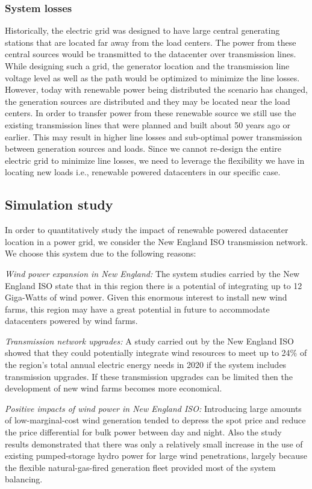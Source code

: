 \subsubsection{System losses}
Historically, the electric grid was designed to have large central generating stations that are located far away from the load centers. The power from these central sources would be transmitted to the datacenter over transmission lines. While designing such a grid, the generator location and the transmission line voltage level as well as the path would be optimized to minimize the line losses.  However, today with renewable power being distributed the scenario has changed, the generation sources are distributed and they may be located near the load centers. In order to transfer power from these renewable source we still use the existing transmission lines that were planned and built about 50 years ago or earlier. This may result in higher line losses and sub-optimal power transmission between generation sources and loads. Since we cannot re-design the entire electric grid to minimize line losses, we need to leverage the flexibility we have in locating new loads i.e., renewable powered datacenters in our specific case.


\subsection{Simulation study}
In order to quantitatively study the impact of renewable powered datacenter location in a power grid, we consider the New England ISO transmission network. We choose this system due to the following reasons:

{\em Wind power expansion in New England:} The system studies carried by the New England ISO state that in this region there is a potential of integrating up to 12 Giga-Watts of wind power. Given this enormous interest to install new wind farms, this region may have a great potential in future to accommodate datacenters powered by wind farms.

{\em Transmission network upgrades:} A study carried out by the New England ISO showed that they could potentially integrate wind resources to meet up to 24\% of the region's total annual electric energy needs in 2020 if the system includes transmission
upgrades. If these transmission upgrades can be limited then the development of new wind farms becomes more economical.

{\em Positive impacts of wind power in New England ISO:} Introducing large amounts of low-marginal-cost wind generation tended to depress the spot price and reduce the price differential for bulk power between day and night. Also the study results demonstrated that there was only a relatively small increase in the use of existing pumped-storage hydro power for large wind penetrations, largely because the flexible natural-gas-fired generation fleet provided most of the system balancing.

